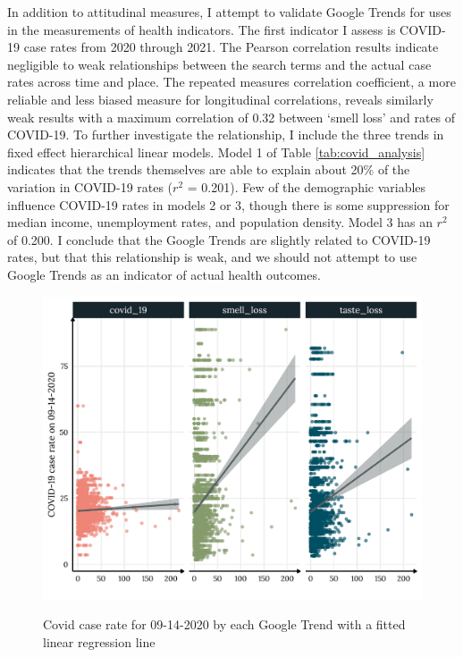 In addition to attitudinal measures, I attempt to validate Google Trends for
uses in the measurements of health indicators. The first indicator I assess is
COVID-19 case rates from 2020 through 2021. The Pearson correlation results
indicate negligible to weak relationships between the search terms and the
actual case rates across time and place. The repeated measures correlation
coefficient, a more reliable and less biased measure for longitudinal
correlations, reveals similarly weak results with a maximum correlation of 0.32
between `smell loss' and rates of COVID-19. To further investigate the
relationship, I include the three trends in fixed effect hierarchical linear
models. Model 1 of Table \ref{tab:covid_analysis} indicates that the trends
themselves are able to explain about 20\% of the variation in COVID-19 rates
($r^2$ = 0.201). Few of the demographic variables influence COVID-19 rates in
models 2 or 3, though there is some suppression for median income, unemployment
rates, and population density. Model 3 has an $r^2$ of 0.200. I conclude that
the Google Trends are slightly related to COVID-19 rates, but that this
relationship is weak, and we should not attempt to use Google Trends as an
indicator of actual health outcomes.


\begin{figure}[h]
{\centering \includegraphics[width=0.8\linewidth]{figs/paper1/covid_plot-1.pdf}}
\caption{Covid case rate for 09-14-2020 by each Google Trend with a fitted linear regression line}\label{fig:covid_plot-1}
\end{figure}

